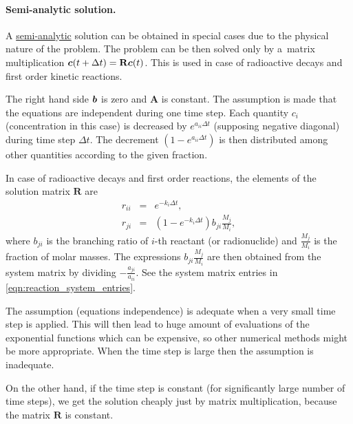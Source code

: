 \paragraph{Semi-analytic solution.}
A \hyperlink{IT::LinearODEAnalytic}{semi-analytic} solution can be obtained in special cases due to the physical nature of the problem.
The problem can be then solved only by a~matrix multiplication $\mathbf{\boldsymbol{c}}(t+\Delta t) = \mathbf{R} \mathbf{\boldsymbol{c}}(t)$. 
This is used in case of radioactive decays and first order kinetic reactions.

The right hand side $\mathbf{\boldsymbol{b}}$ is zero and $\mathbf{A}$ is constant. The assumption is made that the equations 
are independent during one time step. Each quantity $c_i$ (concentration in this case) is decreased 
by $e^{a_{ii} \Delta t}$ (supposing negative diagonal) during time step $\Delta t$. The decrement $\left( 1-e^{a_{ii} \Delta t} \right)$
is then distributed among other quantities according to the given fraction.

In case of radioactive decays and first order reactions, the elements of the solution matrix $\mathbf{R}$ are
\begin{eqnarray*}
     r_{ii} &=& e^{-k_i \Delta t}, \\
     r_{ji} &=& \left( 1-e^{-k_i \Delta t} \right) b_{ji} \frac{M_j}{M_i},
\end{eqnarray*}
where $b_{ji}$ is the branching ratio of $i$-th reactant (or radionuclide) and $\frac{M_j}{M_i}$ is 
the fraction of molar masses.
The expressions $b_{ji} \frac{M_j}{M_i}$ are then obtained from the system matrix by dividing 
$-\frac{a_{ji}}{a_{ii}}$. See the system matrix entries in \eqref{eqn:reaction_system_entries}.

The assumption (equations independence) is adequate when a very small time step is applied. This will then lead 
to huge amount of evaluations of the exponential functions which can be expensive, so other numerical methods 
might be more appropriate. When the time step is large then the assumption is inadequate.

On the other hand, if the time step is constant (for significantly large number of time steps), we get the
solution cheaply just by matrix multiplication, because the matrix $\mathbf{R}$ is constant.



